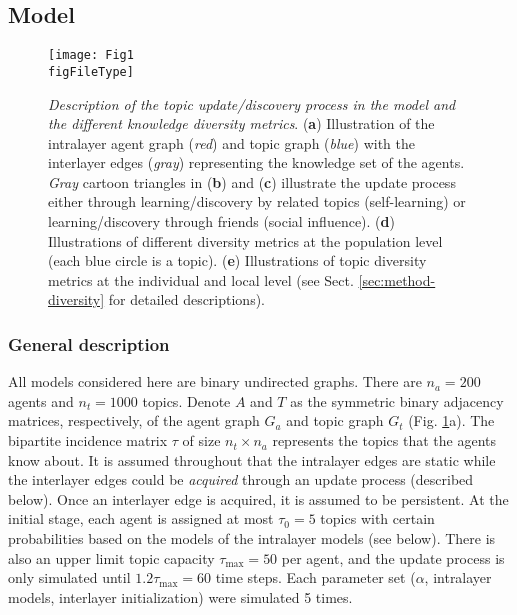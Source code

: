 \documentclass{svproc}
\def\figFileType{.eps}
\begin{document}
\subsection{Model} \label{sec:method-model}

\begin{figure}[!ht]
    \centering
    \texttt{[image: Fig1\\figFileType]}
    \caption{
    \textit{Description of the topic update/discovery process in the model and the different knowledge diversity metrics}.
    (\textbf{a}) Illustration of the intralayer agent graph (\textit{red}) and topic graph (\textit{blue}) with the interlayer edges (\textit{gray}) representing the knowledge set of the agents.
    \textit{Gray} cartoon triangles in (\textbf{b}) and (\textbf{c}) illustrate the update process either through learning/discovery by related topics (self-learning) or learning/discovery through friends (social influence).
    (\textbf{d}) Illustrations of different diversity metrics at the population level (each blue circle is a topic).
    (\textbf{e}) Illustrations of topic diversity metrics at the individual and local level (see Sect. \ref{sec:method-diversity} for detailed descriptions).
    }
    \label{fig:1}
\end{figure}

\subsubsection*{General description}

All models considered here are binary undirected graphs.
There are $n_a = 200$ agents and $n_t = 1000$ topics.
Denote $A$ and $T$ as the symmetric binary adjacency matrices, respectively, of the agent graph $G_a$ and topic graph $G_t$ (Fig. \ref{fig:1}a).
The bipartite incidence matrix $\tau$ of size $n_t \times n_a$ represents the topics that the agents know about.
It is assumed throughout that the intralayer edges are static while the interlayer edges could be \textit{acquired} through an update process (described below).
Once an interlayer edge is acquired, it is assumed to be persistent.
At the initial stage, each agent is assigned at most $\tau_0 = 5$ topics with certain probabilities based on the models of the intralayer models (see below).
There is also an upper limit topic capacity $\tau_{\mathrm{max}} = 50$ per agent, and the update process is only simulated until $1.2 \tau_{\mathrm{max}} = 60$ time steps.
Each parameter set ($\alpha$, intralayer models, interlayer initialization) were simulated 5 times.
\end{document}
